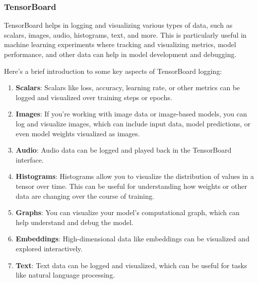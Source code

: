\subsubsection{TensorBoard}
TensorBoard helps in logging and visualizing various types of data, such as scalars, images, audio, histograms, text, and more. This is particularly useful in machine learning experiments where tracking and visualizing metrics, model performance, and other data can help in model development and debugging.

Here's a brief introduction to some key aspects of TensorBoard logging:
\begin{enumerate}
    \item \textbf{Scalars}: Scalars like loss, accuracy, learning rate, or other metrics can be logged and visualized over training steps or epochs.
    \item \textbf{Images}: If you're working with image data or image-based models, you can log and visualize images, which can include input data, model predictions, or even model weights visualized as images.
    \item \textbf{Audio}: Audio data can be logged and played back in the TensorBoard interface.
    \item \textbf{Histograms}: Histograms allow you to visualize the distribution of values in a tensor over time. This can be useful for understanding how weights or other data are changing over the course of training.
    \item \textbf{Graphs}: You can visualize your model's computational graph, which can help understand and debug the model.
    \item \textbf{Embeddings}: High-dimensional data like embeddings can be visualized and explored interactively.
    \item \textbf{Text}: Text data can be logged and visualized, which can be useful for tasks like natural language processing.
\end{enumerate}